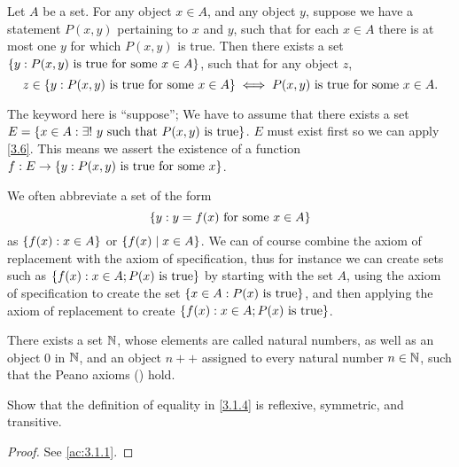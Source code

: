 \begin{ax}[Replacement]\label{3.6}
  Let \(A\) be a set.
  For any object \(x \in A\), and any object \(y\), suppose we have a statement \(P(x, y)\) pertaining to \(x\) and \(y\), such that for each \(x \in A\) there is at most one \(y\) for which \(P(x, y)\) is true.
  Then there exists a set \(\left\lbrace y : P(x, y) \text{ is true for some } x \in A\right\rbrace\), such that for any object \(z\),
  \[
    z \in \left\lbrace y: P(x, y) \text{ is true for some } x \in A\right\rbrace \iff P(x, y) \text{ is true for some } x \in A.
  \]
\end{ax}

\begin{note}
  The keyword here is ``suppose'';
  We have to assume that there exists a set \(E = \left\lbrace x \in A : \exists!\ y \text{ such that } P(x, y) \text{ is true}\right\rbrace\).
  \(E\) must exist first so we can apply \cref{3.6}.
  This means we assert the existence of a function \(f : E \to \left\lbrace y : P(x, y) \text{ is true for some } x\right\rbrace\).
\end{note}

\begin{note}
  We often abbreviate a set of the form
  \[
    \left\lbrace y : y = f(x) \text{ for some } x \in A\right\rbrace
  \]
  as \(\left\lbrace f(x) : x \in A\right\rbrace\) or \(\left\lbrace f(x) \mid x \in A\right\rbrace\).
  We can of course combine the axiom of replacement with the axiom of specification, thus for instance we can create sets such as \(\left\lbrace f(x) : x \in A; P(x) \text{ is true}\right\rbrace\) by starting with the set \(A\), using the axiom of specification to create the set \(\left\lbrace x \in A : P(x) \text{ is true}\right\rbrace\), and then applying the axiom of replacement to create \(\left\lbrace f(x) : x \in A; P(x) \text{ is true}\right\rbrace\).
\end{note}

\begin{ax}[Infinity]\label{3.7}
  There exists a set \(\mathbb{N}\), whose elements are called natural numbers, as well as an object \(0\) in \(\mathbb{N}\), and an object \(n++\) assigned to every natural number \(n \in \mathbb{N}\), such that the Peano axioms () hold.
\end{ax}

\exercisesection

\begin{ex}\label{ex:3.1.1}
  Show that the definition of equality in \cref{3.1.4} is reflexive, symmetric, and transitive.
\end{ex}

\begin{proof}
  See \cref{ac:3.1.1}.
\end{proof}


